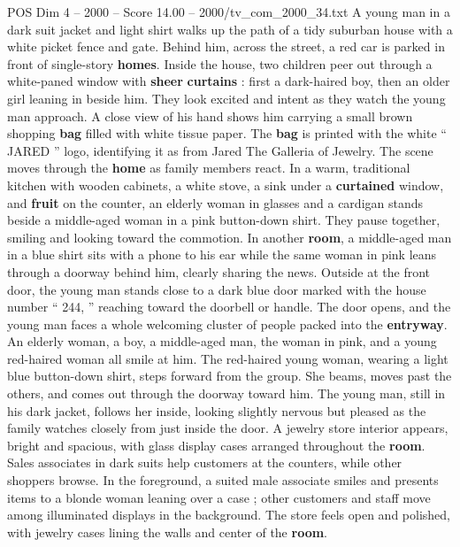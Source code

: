 \begin{textsample}{POS Dim 4 – 2000 – Score 14.00 – 2000/tv\_com\_2000\_34.txt}  \label{ex:f4_pos_056}
A young man in a dark suit jacket and light shirt walks up the path of a tidy suburban house with a white picket fence and gate.
Behind him, across the street, a red car is parked in front of single-story \textbf{homes}.
Inside the house, two children peer out through a white-paned window with \textbf{sheer} \textbf{curtains} : first a dark-haired boy, then an older girl leaning in beside him.
They look excited and intent as they watch the young man approach.
A close view of his hand shows him carrying a small brown shopping \textbf{bag} filled with white tissue paper.
The \textbf{bag} is printed with the white “ JARED ” logo, identifying it as from Jared The Galleria of Jewelry.
The scene moves through the \textbf{home} as family members react.
In a warm, traditional kitchen with wooden cabinets, a white stove, a sink under a \textbf{curtained} window, and \textbf{fruit} on the counter, an elderly woman in glasses and a cardigan stands beside a middle-aged woman in a pink button-down shirt.
They pause together, smiling and looking toward the commotion.
In another \textbf{room}, a middle-aged man in a blue shirt sits with a phone to his ear while the same woman in pink leans through a doorway behind him, clearly sharing the news.
Outside at the front door, the young man stands close to a dark blue door marked with the house number “ 244, ” reaching toward the doorbell or handle.
The door opens, and the young man faces a whole welcoming cluster of people packed into the \textbf{entryway}.
An elderly woman, a boy, a middle-aged man, the woman in pink, and a young red-haired woman all smile at him.
The red-haired young woman, wearing a light blue button-down shirt, steps forward from the group.
She beams, moves past the others, and comes out through the doorway toward him.
The young man, still in his dark jacket, follows her inside, looking slightly nervous but pleased as the family watches closely from just inside the door.
A jewelry store interior appears, bright and spacious, with glass display cases arranged throughout the \textbf{room}.
Sales associates in dark suits help customers at the counters, while other shoppers browse.
In the foreground, a suited male associate smiles and presents items to a blonde woman leaning over a case ; other customers and staff move among illuminated displays in the background.
The store feels open and polished, with jewelry cases lining the walls and center of the \textbf{room}.

\end{textsample}
